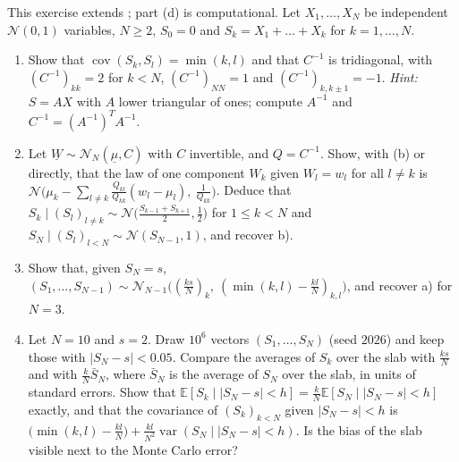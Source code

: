\begin{exercise}\label{ex:gc-partial-sums-bridge}
\hard This exercise extends ; part (d) is computational. Let
$X_1,\dots,X_N$ be independent $\mathcal N(0,1)$ variables, $N\ge2$, $S_0=0$ and
$S_k=X_1+\dots+X_k$ for $k=1,\dots,N$.
\begin{enumerate}[label=(\alph*)]
  \item Show that $\operatorname{cov}(S_k,S_l)=\min(k,l)$ and that $C^{-1}$ is tridiagonal, with
    $(C^{-1})_{kk}=2$ for $k<N$, $(C^{-1})_{NN}=1$ and $(C^{-1})_{k,k\pm1}=-1$. \emph{Hint:} $S=AX$
    with $A$ lower triangular of ones; compute $A^{-1}$ and $C^{-1}=(A^{-1})^TA^{-1}$.
  \item Let $\underline W\sim\mathcal N_N(\underline\mu,C)$ with $C$ invertible, and $Q=C^{-1}$. Show, with
     (b) or directly, that the law of one component $W_k$ given
    $W_l=w_l$ for all $l\ne k$ is
    $\mathcal N\big(\mu_k-\sum_{l\ne k}\frac{Q_{kl}}{Q_{kk}}(w_l-\mu_l),\ \frac1{Q_{kk}}\big)$. Deduce that
    $S_k\mid(S_l)_{l\ne k}\sim\mathcal N\big(\frac{S_{k-1}+S_{k+1}}2,\frac12\big)$ for $1\le k<N$ and
    $S_N\mid(S_l)_{l<N}\sim\mathcal N(S_{N-1},1)$, and recover  b).
  \item Show that, given $S_N=s$, $(S_1,\dots,S_{N-1})\sim\mathcal N_{N-1}\big((\frac{ks}N)_k,\ (\min(k,l)-\frac{kl}N)_{k,l}\big)$,
    and recover  a) for $N=3$.
  \item Let $N=10$ and $s=2$. Draw $10^6$ vectors $(S_1,\dots,S_N)$ (seed $2026$) and keep those
    with $|S_N-s|<0.05$. Compare the averages of $S_k$ over the slab with $\frac{ks}N$ and with
    $\frac kN\bar S_N$, where $\bar S_N$ is the average of $S_N$ over the slab, in units of standard
    errors. Show that $\mathbb E[S_k\mid|S_N-s|<h]=\frac kN\mathbb E[S_N\mid|S_N-s|<h]$ exactly, and
    that the covariance of $(S_k)_{k<N}$ given $|S_N-s|<h$ is
    $\big(\min(k,l)-\frac{kl}N\big)+\frac{kl}{N^2}\operatorname{var}(S_N\mid|S_N-s|<h)$. Is the bias of
    the slab visible next to the Monte Carlo error?
\end{enumerate}
\end{exercise}
